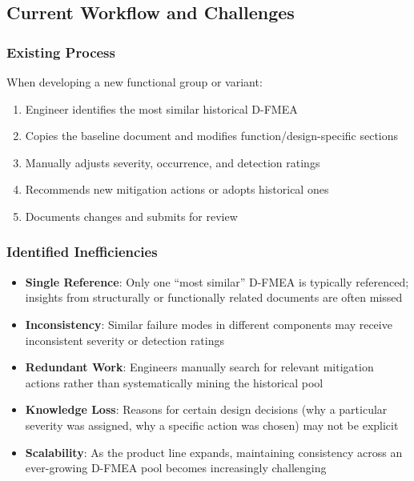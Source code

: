 \subsection*{Current Workflow and Challenges}

\subsubsection*{Existing Process}

When developing a new functional group or variant:

\begin{enumerate}
    \item Engineer identifies the most similar historical D-FMEA
    \item Copies the baseline document and modifies function/design-specific sections
    \item Manually adjusts severity, occurrence, and detection ratings
    \item Recommends new mitigation actions or adopts historical ones
    \item Documents changes and submits for review
\end{enumerate}

\subsubsection*{Identified Inefficiencies}

\begin{itemize}
    \item \textbf{Single Reference}: Only one ``most similar'' D-FMEA is typically referenced; insights from structurally or functionally related documents are often missed
    \item \textbf{Inconsistency}: Similar failure modes in different components may receive inconsistent severity or detection ratings
    \item \textbf{Redundant Work}: Engineers manually search for relevant mitigation actions rather than systematically mining the historical pool
    \item \textbf{Knowledge Loss}: Reasons for certain design decisions (why a particular severity was assigned, why a specific action was chosen) may not be explicit
    \item \textbf{Scalability}: As the product line expands, maintaining consistency across an ever-growing D-FMEA pool becomes increasingly challenging
\end{itemize}

